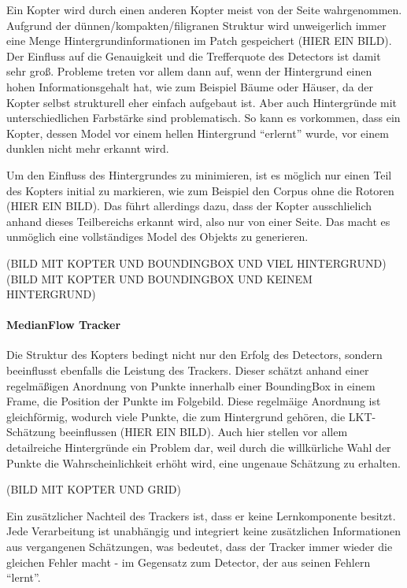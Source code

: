 	Ein Kopter wird durch einen anderen Kopter meist von der Seite wahrgenommen. Aufgrund der dünnen/kompakten/filigranen Struktur wird unweigerlich immer eine Menge Hintergrundinformationen im Patch gespeichert (HIER EIN BILD). Der Einfluss auf die Genauigkeit und die Trefferquote des Detectors ist damit sehr groß. Probleme treten vor allem dann auf, wenn der Hintergrund einen hohen Informationsgehalt hat, wie zum Beispiel Bäume oder Häuser, da der Kopter selbst strukturell eher einfach aufgebaut ist. Aber auch Hintergründe mit unterschiedlichen Farbstärke sind problematisch. So kann es vorkommen, dass ein Kopter, dessen Model vor einem hellen Hintergrund ``erlernt'' wurde, vor einem dunklen nicht mehr erkannt wird. 

	Um den Einfluss des Hintergrundes zu minimieren, ist es möglich nur einen Teil des Kopters initial zu markieren, wie zum Beispiel den Corpus ohne die Rotoren (HIER EIN BILD). Das führt allerdings dazu, dass der Kopter ausschlielich anhand dieses Teilbereichs erkannt wird, also nur von einer Seite. Das macht es unmöglich eine vollständiges Model des Objekts zu generieren.

	(BILD MIT KOPTER UND BOUNDINGBOX UND VIEL HINTERGRUND)
	(BILD MIT KOPTER UND BOUNDINGBOX UND KEINEM HINTERGRUND)

	\paragraph{MedianFlow Tracker}
	Die Struktur des Kopters bedingt nicht nur den Erfolg des Detectors, sondern beeinflusst ebenfalls die Leistung des Trackers. Dieser schätzt anhand einer regelmäßigen Anordnung von Punkte innerhalb einer BoundingBox in einem Frame, die Position der Punkte im Folgebild. Diese regelmäige Anordnung ist gleichförmig, wodurch viele Punkte, die zum Hintergrund gehören, die LKT-Schätzung beeinflussen (HIER EIN BILD). Auch hier stellen vor allem detailreiche Hintergründe ein Problem dar, weil durch die willkürliche Wahl der Punkte die Wahrscheinlichkeit erhöht wird, eine ungenaue Schätzung zu erhalten.

	(BILD MIT KOPTER UND GRID)

	Ein zusätzlicher Nachteil des Trackers ist, dass er keine Lernkomponente besitzt. Jede Verarbeitung ist unabhängig und integriert keine zusätzlichen Informationen aus vergangenen Schätzungen, was bedeutet, dass der Tracker immer wieder die gleichen Fehler macht - im Gegensatz zum Detector, der aus seinen Fehlern ``lernt''. 


